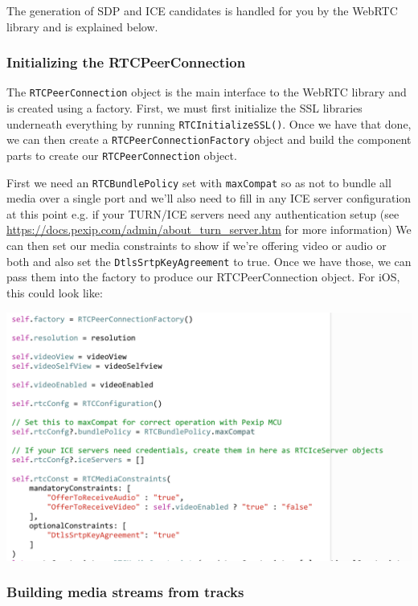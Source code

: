 \documentclass[a4paper,11pt]{article}
\begin{document}
The generation of SDP and ICE candidates is handled for you by the
WebRTC library and is explained below.

\subsubsection{Initializing the RTCPeerConnection}
\label{sec:orgheadline20}

The \texttt{RTCPeerConnection} object is the main interface to the WebRTC
library and is created using a factory.  First, we must first
initialize the SSL libraries underneath everything by running
\texttt{RTCInitializeSSL()}. Once we have that done, we can then create a
\texttt{RTCPeerConnectionFactory} object and build the component
parts to create our \texttt{RTCPeerConnection} object.

First we need an \texttt{RTCBundlePolicy} set with \texttt{maxCompat} so as not to
bundle all media over a single port and we'll also need to fill in any
ICE server configuration at this point e.g. if your TURN/ICE servers
need any authentication setup (see
\url{https://docs.pexip.com/admin/about_turn_server.htm} for more
information)
We can then set our media constraints to show if we're offering video
or audio or both and also set the \texttt{DtlsSrtpKeyAgreement} to true.
Once we have those, we can pass them into the factory to produce our
RTCPeerConnection object.  For iOS, this could look like:

\includegraphics[width=.9\linewidth]{./images/peer_connection.png}


\subsubsection{Building media streams from tracks}
\label{sec:orgheadline21}
\end{document}
